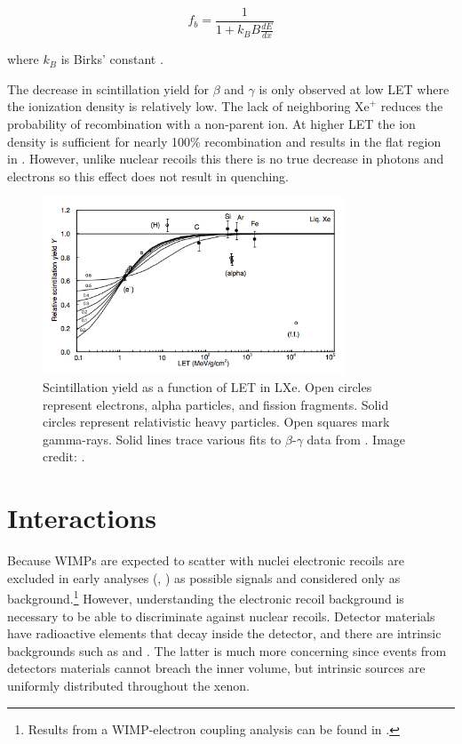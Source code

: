 \begin{equation}
f_{b} = \frac{1}{1 + k_B B \frac{dE}{dx}}
\label{eq:nr_scint_quench}
\end{equation}

\noindent where $k_B$ is Birks' constant .

The decrease in scintillation yield for $\beta$ and $\gamma$ is only observed at low LET where the ionization density is relatively
low.  The
lack of neighboring $\mathrm{Xe}^{+}$ reduces the probability of recombination with a non-parent ion.  At higher LET the ion density
is sufficient for nearly 100\% recombination and results in the flat region in .  However, unlike nuclear
recoils this there is no true decrease in photons and electrons so this effect does not result in quenching.

\begin{figure}
\includegraphics[width=0.8\textwidth]{ScintillationYield}
\caption{Scintillation yield as a function of LET in LXe.  Open circles represent electrons, alpha particles, and fission
fragments.  Solid circles represent relativistic heavy particles.  Open squares mark gamma-rays.  Solid lines trace various fits
to $\beta$-$\gamma$ data from .  Image credit: .}
\label{fig:scintillation_yield}
\end{figure}



\section{Interactions}
\label{sec:interactions}
Because WIMPs are expected to scatter with nuclei electronic recoils are excluded in early analyses (,
) as possible signals and considered only as background.\footnote{Results from a WIMP-electron coupling analysis can
be found in .}  However, understanding the electronic recoil background is necessary to be able to discriminate
against nuclear recoils.  Detector materials have radioactive elements that decay inside the detector, and there are intrinsic
backgrounds such as \krypton and \radon.  The latter is much more concerning since events from
detectors materials cannot breach the inner volume, but intrinsic sources are uniformly distributed throughout the xenon.

